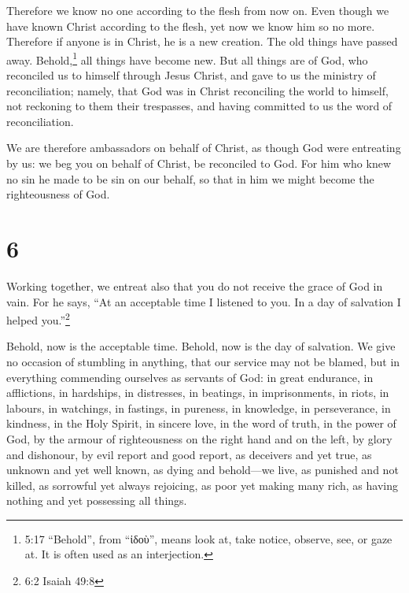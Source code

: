  Therefore we know no one according to the flesh from now
on. Even though we have known Christ according to the flesh, yet now we
know him so no more.  Therefore if anyone is in Christ, he
is a new creation. The old things have passed away. Behold,\footnote{5:17
  ``Behold'', from ``ἰδοὺ'', means look at, take notice, observe, see,
  or gaze at. It is often used as an interjection.} all things have
become new.  But all things are of God, who reconciled us
to himself through Jesus Christ, and gave to us the ministry of
reconciliation;  namely, that God was in Christ reconciling
the world to himself, not reckoning to them their trespasses, and having
committed to us the word of reconciliation.

 We are therefore ambassadors on behalf of Christ, as
though God were entreating by us: we beg you on behalf of Christ, be
reconciled to God.  For him who knew no sin he made to be
sin on our behalf, so that in him we might become the righteousness of
God.

\hypertarget{section-5}{%
\section{6}\label{section-5}}

 Working together, we entreat also that you do not receive
the grace of God in vain.  For he says, ``At an acceptable
time I listened to you. In a day of salvation I helped you.''\footnote{6:2
  Isaiah 49:8}

Behold, now is the acceptable time. Behold, now is the day of salvation.
 We give no occasion of stumbling in anything, that our
service may not be blamed,  but in everything commending
ourselves as servants of God: in great endurance, in afflictions, in
hardships, in distresses,  in beatings, in imprisonments, in
riots, in labours, in watchings, in fastings,  in pureness,
in knowledge, in perseverance, in kindness, in the Holy Spirit, in
sincere love,  in the word of truth, in the power of God, by
the armour of righteousness on the right hand and on the left,
 by glory and dishonour, by evil report and good report, as
deceivers and yet true,  as unknown and yet well known, as
dying and behold---we live, as punished and not killed,  as
sorrowful yet always rejoicing, as poor yet making many rich, as having
nothing and yet possessing all things.

